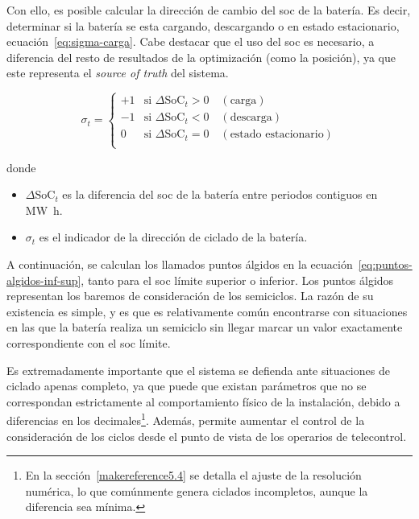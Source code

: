 Con ello, es posible calcular la dirección de cambio del \gls{soc} de la batería. Es decir, determinar si la batería se esta cargando, descargando o en estado estacionario, ecuación~\ref{eq:sigma-carga}. Cabe destacar que el uso del \gls{soc} es necesario, a diferencia del resto de resultados de la optimización (como la posición), ya que este representa el \textit{source of truth} del sistema.

\begin{samepage}

  \begin{equation}
    \label{eq:sigma-carga}
    \sigma_{t} =
    \begin{cases}
      +1 & \text{si } \Delta\mathrm{SoC}_{t} > 0 \quad (\text{carga})               \\
      -1 & \text{si } \Delta\mathrm{SoC}_{t} < 0 \quad (\text{descarga})            \\
      0  & \text{si } \Delta\mathrm{SoC}_{t} = 0 \quad (\text{estado estacionario}) \\
    \end{cases}
  \end{equation}

  donde

  \begin{itemize}

    \item \( \Delta \mathrm{SoC}_{t} \) es la diferencia del \gls{soc} de la batería entre periodos contiguos en \si{{\mega\watt\hour}}.

    \item \( \sigma_{t} \) es el indicador de la dirección de ciclado de la batería.

  \end{itemize}

\end{samepage}

A continuación, se calculan los llamados puntos álgidos en la ecuación~\ref{eq:puntos-algidos-inf-sup}, tanto para el \gls{soc} límite superior o inferior. Los puntos álgidos representan los baremos de consideración de los semiciclos. La razón de su existencia es simple, y es que es relativamente común encontrarse con situaciones en las que la batería realiza un semiciclo sin llegar marcar un valor exactamente correspondiente con el \gls{soc} límite.

Es extremadamente importante que el sistema se defienda ante situaciones de ciclado apenas completo, ya que puede que existan parámetros que no se correspondan estrictamente al comportamiento físico de la instalación, debido a diferencias en los decimales\footnote{En la sección~\ref{makereference5.4} se detalla el ajuste de la resolución numérica, lo que comúnmente genera ciclados incompletos, aunque la diferencia sea mínima.}. Además, permite aumentar el control de la consideración de los ciclos desde el punto de vista de los operarios de telecontrol.

